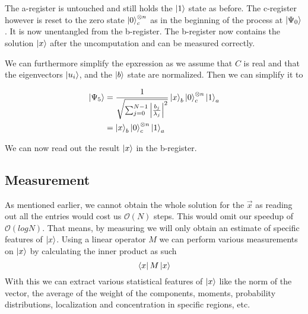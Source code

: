 The a-register is untouched and still holds the $\ket 1$ state as before. 
The c-register however is reset to the zero state $\ket{0}^{\otimes n}_c$ as in the beginning of the process at $\ket {\Psi_0}$. 
It is now unentangled from the b-register.
The b-register now contains the solution $\ket x$ after the uncomputation and can be measured correctly.

We can furthermore simplify the epxression as we assume that  $C$ is real and that the eigenvectors $\ket{u_i}$, and the $\ket b$ state are normalized.
Then we can simplify it to

\begin{equation}
\begin{split}
\ket{\Psi_5} &= \frac {1} {\sqrt{\sum_{j=0}^{N-1} \left| \frac{b_j} {\lambda_j}\right|^2}}
\ket{x}_b \ket{0}^{\otimes n}_c \ket{1}_a\\
&= \ket{x}_b \ket{0}^{\otimes n}_c \ket{1}_a
\end{split}
\end{equation}

We can now read out the result $\ket x$ in the b-register.

\subsection{Measurement}
As mentioned earlier, we cannot obtain the whole solution for the $\vec x$ as reading out all the entries would cost us $\mathcal{O}(N)$ steps.
This would omit our speedup of $\mathcal{O}(log N)$. 
That means, by measuring we will only obtain an estimate of specific features of $\ket x$.
Using a linear operator $M$ we can perform various measurements on $\ket x$ by calculating the inner product as such
\begin{equation}
    \bra x M \ket x
\end{equation}
With this we can extract various statistical features of $\ket x$ like the norm of the vector, the average of the weight of the components, moments, probability distributions, localization and concentration in specific regions, etc.


























